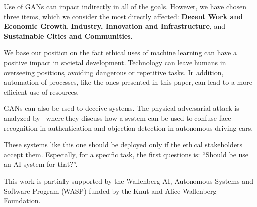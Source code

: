 \documentclass[12pt]{article}
\begin{document}
    Use of GANs can impact indirectly in all of the goals.
    However, we have chosen three items, which we consider the most directly affected:
    \textbf{Decent Work and Economic Growth}, \textbf{Industry, Innovation and Infrastructure}, and
    \textbf{Sustainable Cities and Communities}.

    We base our position on the fact ethical uses of machine learning can have a positive impact in societal development.
    Technology can leave humans in overseeing positions, avoiding dangerous or repetitive tasks.
    In addition, automation of processes, like the ones presented in this paper, can lead to a more efficient use of resources.

    GANs can also be used to deceive systems.
    The physical adversarial attack is analyzed by~\cite{zhao2019seeing} where they discuss
    how a system can be used to confuse face recognition in authentication and objection detection in autonomous driving cars.

    These systems like this one should be deployed only if the ethical stakeholders accept them.
    Especially, for a specific task, the first questions is: ``Should be use an AI system for that?''.


    \begin{ack}
        This work is partially supported by the Wallenberg AI, Autonomous Systems and Software Program (WASP) funded by the Knut and Alice Wallenberg Foundation.
    \end{ack}

    

    
\end{document}
